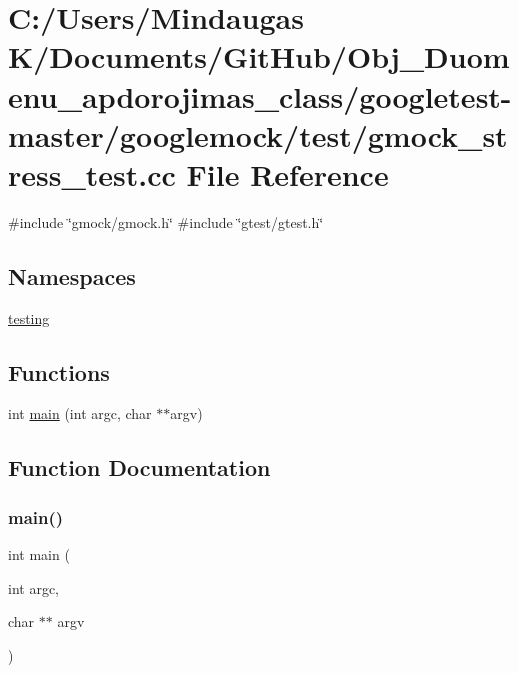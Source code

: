 \hypertarget{googletest-master_2googlemock_2test_2gmock__stress__test_8cc}{}\section{C\+:/\+Users/\+Mindaugas K/\+Documents/\+Git\+Hub/\+Obj\+\_\+\+Duomenu\+\_\+apdorojimas\+\_\+class/googletest-\/master/googlemock/test/gmock\+\_\+stress\+\_\+test.cc File Reference}
\label{googletest-master_2googlemock_2test_2gmock__stress__test_8cc}
{\ttfamily \#include \char`\"{}gmock/gmock.\+h\char`\"{}}\newline
{\ttfamily \#include \char`\"{}gtest/gtest.\+h\char`\"{}}\newline
\subsection*{Namespaces}
\begin{DoxyCompactItemize}
\item 
 \mbox{\hyperlink{namespacetesting}{testing}}
\end{DoxyCompactItemize}
\subsection*{Functions}
\begin{DoxyCompactItemize}
\item 
int \mbox{\hyperlink{googletest-master_2googlemock_2test_2gmock__stress__test_8cc_a3c04138a5bfe5d72780bb7e82a18e627}{main}} (int argc, char $\ast$$\ast$argv)
\end{DoxyCompactItemize}


\subsection{Function Documentation}
\mbox{\label{googletest-master_2googlemock_2test_2gmock__stress__test_8cc_a3c04138a5bfe5d72780bb7e82a18e627}} 
\subsubsection{\texorpdfstring{main()}{main()}}
{\footnotesize\ttfamily int main (\begin{DoxyParamCaption}\item[{int}]{argc,  }\item[{char $\ast$$\ast$}]{argv }\end{DoxyParamCaption})}



